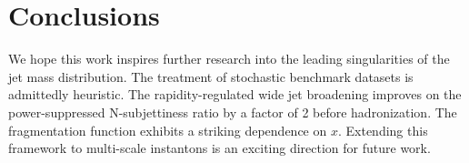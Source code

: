 \section{Conclusions}\label{sec:conclusions}

We hope this work inspires further research into the leading
singularities of the jet mass distribution. The treatment of stochastic
benchmark datasets is admittedly heuristic. The rapidity-regulated wide
jet broadening improves on the power-suppressed N-subjettiness ratio by
a factor of 2 before hadronization. The fragmentation function exhibits
a striking dependence on $x$. Extending this framework to multi-scale
instantons is an exciting direction for future work.

